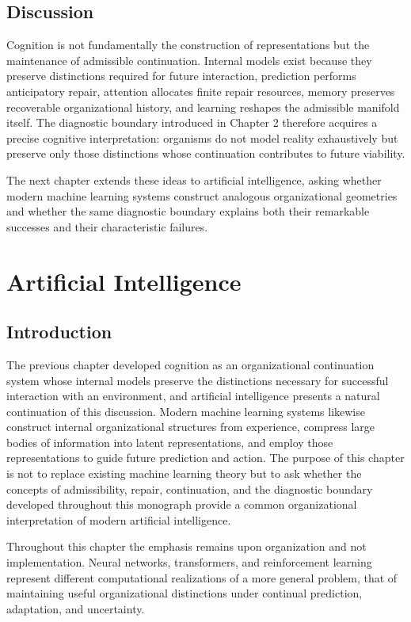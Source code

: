 \documentclass[11pt,oneside]{book}
\numberwithin{equation}{chapter}
\theoremstyle{definition}
\theoremstyle{plain}
\begin{document}
\section{Discussion}

Cognition is not fundamentally the construction of representations but the maintenance of admissible continuation. Internal models exist because they preserve distinctions required for future interaction, prediction performs anticipatory repair, attention allocates finite repair resources, memory preserves recoverable organizational history, and learning reshapes the admissible manifold itself. The diagnostic boundary introduced in Chapter 2 therefore acquires a precise cognitive interpretation: organisms do not model reality exhaustively but preserve only those distinctions whose continuation contributes to future viability.

The next chapter extends these ideas to artificial intelligence, asking whether modern machine learning systems construct analogous organizational geometries and whether the same diagnostic boundary explains both their remarkable successes and their characteristic failures.

\chapter{Artificial Intelligence}

\section{Introduction}

The previous chapter developed cognition as an organizational continuation system whose internal models preserve the distinctions necessary for successful interaction with an environment, and artificial intelligence presents a natural continuation of this discussion. Modern machine learning systems likewise construct internal organizational structures from experience, compress large bodies of information into latent representations, and employ those representations to guide future prediction and action. The purpose of this chapter is not to replace existing machine learning theory but to ask whether the concepts of admissibility, repair, continuation, and the diagnostic boundary developed throughout this monograph provide a common organizational interpretation of modern artificial intelligence.

Throughout this chapter the emphasis remains upon organization and not implementation. Neural networks, transformers, and reinforcement learning represent different computational realizations of a more general problem, that of maintaining useful organizational distinctions under continual prediction, adaptation, and uncertainty.
\end{document}
